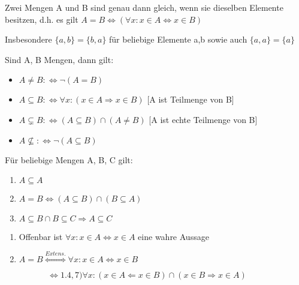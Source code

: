 \documentclass{../../meta/tudscript}
\begin{document}

Zwei Mengen A und B sind genau dann gleich, wenn sie dieselben Elemente
besitzen, d.h. es gilt \(A = B \iff (\forall x: x \in A \iff x \in B)\)


Insbesondere \(\{a, b\} = \{b, a\}\) für beliebige Elemente a,b sowie
auch \(\{a, a\} = \{a\}\)


Sind A, B Mengen, dann gilt:

\begin{itemize}

\item
  \(A \neq B :\iff \neg(A = B)\)
\item
  \(A \subseteq B :\iff \forall x: (x \in A \Rightarrow x \in B)\) {[}A
  ist Teilmenge von B{]}
\item
  \(A \subsetneq B :\iff (A \subseteq B) \cap (A \neq B)\) {[}A ist
  echte Teilmenge von B{]}
\item
  \(A \nsubseteq :\iff \neg (A \subseteq B)\)
\end{itemize}


Für beliebige Mengen A, B, C gilt:

\begin{enumerate}
\def\labelenumi{\arabic{enumi}.}

\item
  \(A \subseteq A\)
\item
  \(A = B \iff (A \subseteq B) \cap (B \subseteq A)\)
\item
  \(A \subseteq B \cap B \subseteq C \Rightarrow A \subseteq C\)
\end{enumerate}


\begin{enumerate}
\def\labelenumi{\arabic{enumi}.}

\item
  Offenbar ist \(\forall x: x \in A \iff x \in A\) eine wahre Aussage
\item
	\(A = B \overset{Extens.}{\iff} \forall x : x \in A \iff x \in B\)
\end{enumerate}

\(\hspace{37pt} \qquad \Leftrightarrow{1.4, 7)} \forall x: (x \in A \Leftarrow x \in B) \cap (x \in B \Rightarrow x \in A)\)
\end{document}
